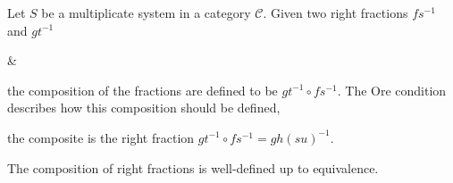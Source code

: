     \begin{definition}
        Let $S$ be a multiplicate system in a category $\mathcal{C}$. Given two right fractions $fs^{-1}$ and $gt^{-1}$
        \begin{center}
            \&
        \end{center}
        the composition of the fractions are defined to be $gt^{-1}\circ fs^{-1}$. The Ore condition describes how this composition should be defined,
        \begin{center}
        \end{center}
        the composite is the right fraction $gt^{-1}\circ fs^{-1} = gh(su)^{-1}$.
    \end{definition}

    \begin{prop}
        The composition of right fractions is well-defined up to equivalence.
    \end{prop}

